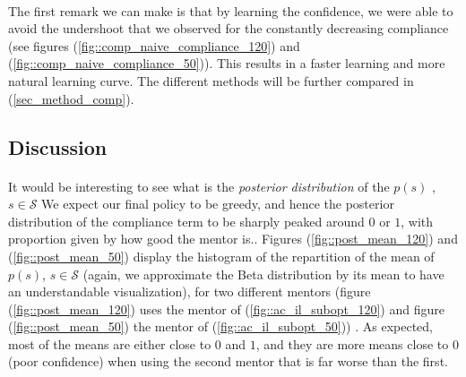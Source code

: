 \documentclass[a4paper]{report}
\begin{document}
{{{{			\paragraph{} The first remark we can make is that by learning the confidence, we were able  to avoid the undershoot that we observed for the constantly decreasing compliance (see figures (\ref{fig::comp_naive_compliance_120}) and (\ref{fig::comp_naive_compliance_50})). This results in a faster learning and more natural learning curve. The different methods will be further compared in (\ref{sec_method_comp}). 
			}
			\subsection{Discussion}
			{
				\paragraph{} It would be interesting to see what is the \emph{posterior distribution} of the $p(s)$ , $s\in\mathcal{S}$ We expect our final policy to be greedy, and hence the posterior distribution of the compliance term to be sharply peaked around $0$ or $1$, with proportion given by how good the mentor is.. Figures (\ref{fig::post_mean_120}) and (\ref{fig::post_mean_50}) display the histogram of the repartition of the mean of $p(s)$, $s\in\mathcal{S}$ (again, we approximate the Beta distribution by its mean to have an understandable visualization), for two different mentors (figure (\ref{fig::post_mean_120}) uses the mentor of (\ref{fig::ac_il_subopt_120}) and figure (\ref{fig::post_mean_50}) the mentor of (\ref{fig::ac_il_subopt_50})) . As expected, most of the means are either close to $0$ and $1$, and they are more means close to 0 (poor confidence) when using the second mentor that is far worse than the first. 
				
}}}}
\end{document}
